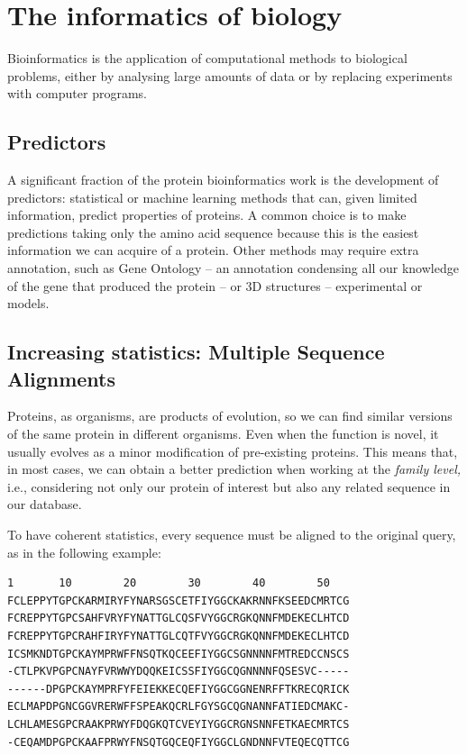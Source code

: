 \chapter{The informatics of biology}
Bioinformatics is the application of computational methods to biological problems,
either by analysing large amounts of data or by replacing experiments with computer programs.

\section{Predictors}
A significant fraction of the protein bioinformatics work is the development of predictors: statistical or machine learning methods that can, given limited information, predict properties of proteins.
A common choice is to make predictions taking only the amino acid sequence because this is the easiest information we can acquire of a protein.
Other methods may require extra annotation, such as Gene Ontology -- an annotation condensing all our knowledge of the gene that produced the protein -- or 3D structures -- experimental or models.

\section[Multiple Sequence Alignments]{Increasing statistics: Multiple Sequence Alignments}
Proteins, as organisms, are products of evolution, so we can find similar versions of the same protein in different organisms.
Even when the function is novel, it usually evolves as a minor modification of pre-existing proteins.
This means that, in most cases, we can obtain a better prediction when working at the \emph{family level,}
i.e., considering not only our protein of interest but also any related sequence in our database.

To have coherent statistics, every sequence must be aligned to the original query, as in the following example:

\begin{center}
\marginpar{\phantom{a}}
\marginpar{\phantom{a}}
\marginpar{\phantom{a}}
\begin{Verbatim}[fontsize=\small, xleftmargin=1em]
1       10        20        30        40        50   
FCLEPPYTGPCKARMIRYFYNARSGSCETFIYGGCKAKRNNFKSEEDCMRTCG
FCREPPYTGPCSAHFVRYFYNATTGLCQSFVYGGCRGKQNNFMDEKECLHTCD
FCREPPYTGPCRAHFIRYFYNATTGLCQTFVYGGCRGKQNNFMDEKECLHTCD
ICSMKNDTGPCKAYMPRWFFNSQTKQCEEFIYGGCSGNNNNFMTREDCCNSCS
-CTLPKVPGPCNAYFVRWWYDQQKEICSSFIYGGCQGNNNNFQSESVC-----
------DPGPCKAYMPRFYFEIEKKECQEFIYGGCGGNENRFFTKRECQRICK
ECLMAPDPGNCGGVRERWFFSPEAKQCRLFGYSGCQGNANNFATIEDCMAKC-
LCHLAMESGPCRAAKPRWYFDQGKQTCVEYIYGGCRGNSNNFETKAECMRTCS
-CEQAMDPGPCKAAFPRWYFNSQTGQCEQFIYGGCLGNDNNFVTEQECQTTCG
\end{Verbatim}
\end{center}

